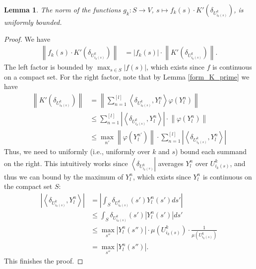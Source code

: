 \documentclass[12pt, a4paper]{article}
\theoremstyle{plain}
\newtheorem{lem}[pro]{Lemma}
\theoremstyle{definition}
\theoremstyle{remark}
\newcommand{\uu}{U_{i_k(s)}^k}
\begin{document}
\begin{lem}\label{final_lemma}
The norm of the functions $g_k: S \to V$, $s \mapsto f_k(s) \cdot K'\left(\delta_{\uu}\right)$, is uniformly bounded.
\end{lem}

\begin{proof}
We have
\begin{align*}
\left\| f_k(s) \cdot K'\left( \delta_{\uu} \right) \right\| & = |f_k(s)| \cdot \left\|  K' \left( \delta_{\uu}\right)\right\|.
\end{align*}
The left factor is bounded by $\max_{s \in S}|f(s)|$, which exists since $f$ is continuous on a compact set. For the right factor, note that by Lemma \ref{form_K_prime} we have
\begin{align*}
\left\|  K' \left( \delta_{\uu}\right)\right\| & = \left\|  \sum_{n = 1}^{[l]} \left\langle \delta_{\uu}, Y_l^n\right\rangle  \varphi(Y_l^n)\right\| \\
& \leq \sum_{n = 1}^{[l]} \left| \left\langle  \delta_{\uu}, Y_l^n \right\rangle \right| \cdot \left\| \varphi(Y_l^n)\right\| \\
& \leq \max_{n'} \left\| \varphi\left(Y_l^{n'}\right)\right\| \cdot \sum_{n = 1}^{[l]} \left| \left\langle  \delta_{\uu}, Y_l^n \right\rangle \right|
\end{align*}
Thus, we need to uniformly (i.e., uniformly over $k$ and $s$) bound each summand on the right. This intuitively works since $\left\langle \delta_{\uu} \right|$ averages $Y_l^n$ over $\uu$, and thus we can bound by the maximum of $Y_l^n$, which exists since $Y_l^n$ is continuous on the compact set $S$:
\begin{align*}
\left| \left\langle \delta_{\uu}, Y_l^n \right\rangle \right| & = \left| \int_{S} \delta_{\uu}(s') Y_l^n(s') ds' \right| \\
& \leq \int_S \delta_{\uu}(s') \left| Y_l^n(s') \right| ds' \\
& \leq \max_{s''} \left| Y_l^n(s'')\right| \cdot \mu\left( \uu\right) \cdot \frac{1}{\mu \left( \uu\right)} \\
& = \max_{s''} \left| Y_l^n(s'')\right|.
\end{align*}
This finishes the proof.
\end{proof}
\end{document}
